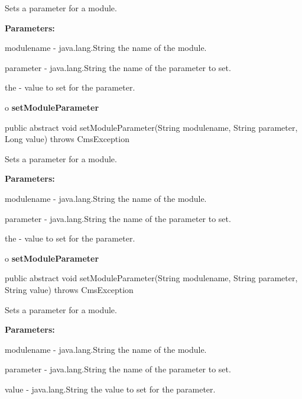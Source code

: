 \begin{description}
\htmlDD Sets a parameter for a module. 

\begin{description}
\item {\bf Parameters:}  

modulename - java.lang.String the name of the module.  

parameter - java.lang.String the name of the parameter to set.  

the - value to set for the parameter.  
\end{description}

\end{description}

o {\bf setModuleParameter} 

\begin{PRE}
 public abstract void setModuleParameter(String modulename,
                                         String parameter,
                                         Long value) throws CmsException
\end{PRE}

\begin{description}
\htmlDD Sets a parameter for a module. 

\begin{description}
\item {\bf Parameters:}  

modulename - java.lang.String the name of the module.  

parameter - java.lang.String the name of the parameter to set.  

the - value to set for the parameter.  
\end{description}

\end{description}

o {\bf setModuleParameter} 

\begin{PRE}
 public abstract void setModuleParameter(String modulename,
                                         String parameter,
                                         String value) throws CmsException
\end{PRE}

\begin{description}
\htmlDD Sets a parameter for a module. 

\begin{description}
\item {\bf Parameters:}  

modulename - java.lang.String the name of the module.  

parameter - java.lang.String the name of the parameter to set.  

value - java.lang.String the value to set for the parameter.  
\end{description}

\end{description}

